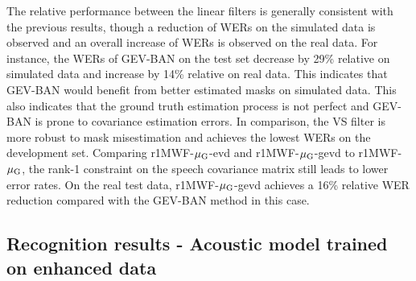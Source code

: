 \documentclass[review]{elsarticle}
\newif\ifminorR
\newcommand{\pfminor}[1]{%
\ifminorR
\textcolor{red}{#1}%
\else
#1%
\fi
}
\begin{document}
\pfminor{The relative performance between the linear filters is generally consistent with the previous results, though a reduction of WERs on the simulated data is observed and an overall increase of WERs is observed on the real data. For instance, the WERs of GEV-BAN on the test set decrease by 29\% relative on simulated data and increase by 14\% relative on real data. This indicates that GEV-BAN would benefit from better estimated masks on simulated data. This also indicates that the ground truth estimation process is not perfect and GEV-BAN is prone to covariance estimation errors. In comparison, the VS filter is more robust to mask misestimation and achieves the lowest WERs on the development set. Comparing r1MWF-$\mu_{\text G}$-evd and r1MWF-$\mu_{\text G}$-gevd to r1MWF-$\mu_{\text G}$, the rank-1 constraint on the speech covariance matrix still leads to lower error rates. On the real test data, r1MWF-$\mu_{\text G}$-gevd achieves a 16\% relative WER reduction compared with the GEV-BAN method in this case.}


\subsection{Recognition results - Acoustic model trained on enhanced data}
\end{document}
